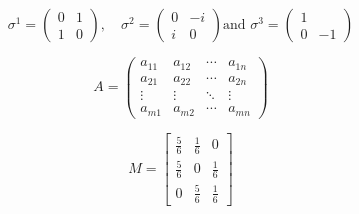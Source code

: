\documentclass[11pt]{article}
\begin{document}
\[
	\sigma^{1} = \begin{pmatrix}
		0 & 1 \\
		1 & 0
	\end{pmatrix}, \quad
	\sigma^{2} = \begin{pmatrix}
		0 & -i \\
		i & 0
	\end{pmatrix} \text{and }
	\sigma^{3} = \begin{pmatrix}
		1 &    \\
		0 & -1
	\end{pmatrix}
\]

\[
	A =
	\begin{pmatrix}
		a_{11} & a_{12} & \cdots & a_{1n} \\
		a_{21} & a_{22} & \cdots & a_{2n} \\
		\vdots & \vdots & \ddots & \vdots \\
		a_{m1} & a_{m2} & \cdots & a_{mn}
	\end{pmatrix}
\]

\[
	M = \begin{bmatrix}
		\frac{5}{6} & \frac{1}{6} & 0           \\[0.3em]
		\frac{5}{6} & 0           & \frac{1}{6} \\[0.3em]
		0           & \frac{5}{6} & \frac{1}{6}
	\end{bmatrix}
\]
\end{document}
